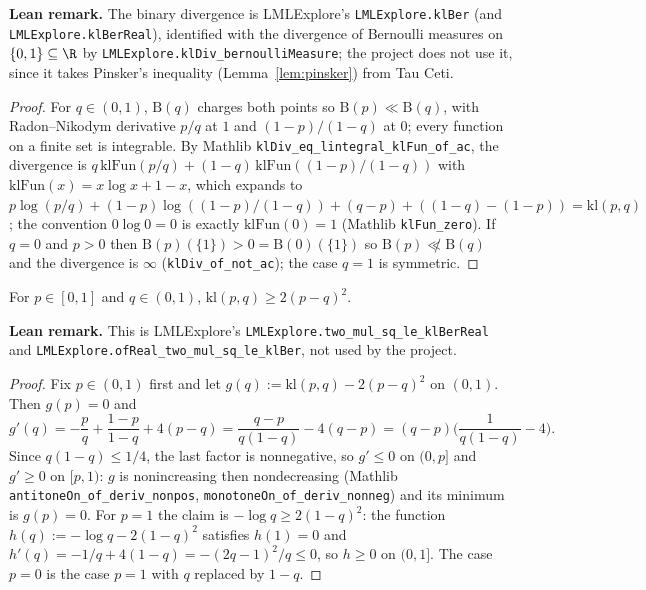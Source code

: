 \textbf{Lean remark.} The binary divergence is LMLExplore's \texttt{LMLExplore.klBer} (and
\texttt{LMLExplore.klBerReal}), identified with the divergence of Bernoulli measures on
$\{0,1\} \subseteq \R$ by \texttt{LMLExplore.klDiv\_bernoulliMeasure}; the project does not use it,
since it takes Pinsker's inequality (Lemma~\ref{lem:pinsker}) from Tau Ceti.

\begin{proof}
\leanok
For $q \in (0,1)$, $\mathrm{B}(q)$ charges both points so $\mathrm{B}(p) \ll \mathrm{B}(q)$, with
Radon--Nikodym derivative $p/q$ at $1$ and $(1-p)/(1-q)$ at $0$; every function on a finite set is
integrable. By Mathlib \texttt{klDiv\_eq\_lintegral\_klFun\_of\_ac}, the divergence is
$q\,\mathrm{klFun}(p/q) + (1-q)\,\mathrm{klFun}((1-p)/(1-q))$ with
$\mathrm{klFun}(x) = x\log x + 1 - x$, which expands to
$p\log(p/q) + (1-p)\log((1-p)/(1-q)) + (q - p) + ((1-q) - (1-p)) = \mathrm{kl}(p,q)$; the
convention $0\log 0 = 0$ is exactly $\mathrm{klFun}(0) = 1$ (Mathlib \texttt{klFun\_zero}). If
$q = 0$ and $p > 0$ then $\mathrm{B}(p)(\{1\}) > 0 = \mathrm{B}(0)(\{1\})$ so $\mathrm{B}(p)
\not\ll \mathrm{B}(q)$ and the divergence is $\infty$ (\texttt{klDiv\_of\_not\_ac}); the case
$q = 1$ is symmetric.
\end{proof}

\begin{lemma}\label{lem:kl_bernoulli_pinsker}
\leanok
{}
For $p \in [0,1]$ and $q \in (0,1)$, $\mathrm{kl}(p,q) \ge 2(p-q)^2$.
\end{lemma}

\textbf{Lean remark.} This is LMLExplore's \texttt{LMLExplore.two\_mul\_sq\_le\_klBerReal} and
\texttt{LMLExplore.ofReal\_two\_mul\_sq\_le\_klBer}, not used by the project.

\begin{proof}
\leanok
{}
Fix $p \in (0,1)$ first and let $g(q) := \mathrm{kl}(p,q) - 2(p-q)^2$ on $(0,1)$. Then
$g(p) = 0$ and
\[
  g'(q) = -\frac{p}{q} + \frac{1-p}{1-q} + 4(p-q) = \frac{q-p}{q(1-q)} - 4(q-p)
  = (q-p)\Big(\frac{1}{q(1-q)} - 4\Big).
\]
Since $q(1-q) \le 1/4$, the last factor is nonnegative, so $g' \le 0$ on $(0,p]$ and $g' \ge 0$
on $[p,1)$: $g$ is nonincreasing then nondecreasing (Mathlib
\texttt{antitoneOn\_of\_deriv\_nonpos}, \texttt{monotoneOn\_of\_deriv\_nonneg}) and its minimum
is $g(p) = 0$. For $p = 1$ the claim is $-\log q \ge 2(1-q)^2$: the function
$h(q) := -\log q - 2(1-q)^2$ satisfies $h(1) = 0$ and $h'(q) = -1/q + 4(1-q) = -(2q-1)^2/q \le 0$,
so $h \ge 0$ on $(0,1]$. The case $p = 0$ is the case $p = 1$ with $q$ replaced by $1-q$.
\end{proof}

